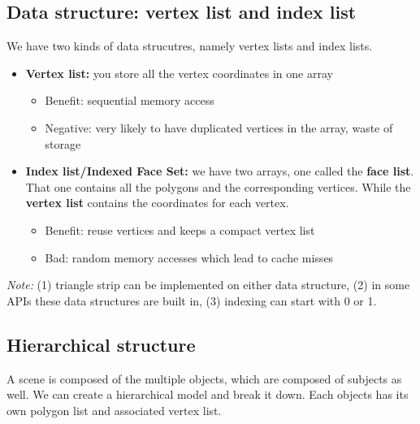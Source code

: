 \documentclass[11pt]{article}
\begin{document}
\subsection{Data structure: vertex list and index list}
We have two kinds of data strucutres, namely vertex lists and index lists. 
\begin{itemize}
    \item \textbf{Vertex list:} you store all the vertex coordinates in one array \begin{itemize}
        \item Benefit: sequential memory access
        \item Negative: very likely to have duplicated vertices in the array, waste of storage
    \end{itemize}
    \item \textbf{Index list/Indexed Face Set:} we have two arrays, one called the \textbf{face list}. That one contains all the polygons and the corresponding vertices. While the \textbf{vertex list} contains the coordinates for each vertex. \begin{itemize}
        \item Benefit: reuse vertices and keeps a compact vertex list
        \item Bad: random memory accesses which lead to cache misses
    \end{itemize}
\end{itemize}

\textit{Note:} (1) triangle strip can be implemented on either data structure, (2) in some APIs these data structures are built in, (3) indexing can start with 0 or 1.

\subsection{Hierarchical structure}
A scene is composed of the multiple objects, which are composed of subjects as well. We can create a hierarchical model and break it down. Each objects has its own polygon list and associated vertex list.
\end{document}
